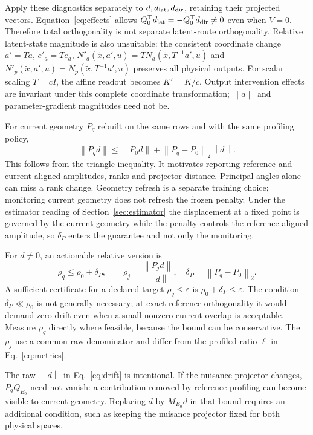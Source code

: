 \documentclass[11pt,a4paper]{article}
\newcommand{\norm}[1]{\left\lVert#1\right\rVert}
\theoremstyle{remark}
\begin{document}
Apply these diagnostics separately to $d,d_{\rm lat},d_{\rm dir}$, retaining their projected vectors. Equation~\eqref{eq:effects} allows $Q_0^\top d_{\rm lat}=-Q_0^\top d_{\rm dir}\ne0$ even when $V=0$. Therefore total orthogonality is not separate latent-route orthogonality. Relative latent-state magnitude is also unsuitable: the consistent coordinate change $a'=Ta$, $e'_a=Te_a$, $N'_a(\tilde x,a',u)=T N_a(\tilde x,T^{-1}a',u)$ and $N'_p(\tilde x,a',u)=N_p(\tilde x,T^{-1}a',u)$ preserves all physical outputs. For scalar scaling $T=cI$, the affine readout becomes $K'=K/c$. Output intervention effects are invariant under this complete coordinate transformation; $\norm a$ and parameter-gradient magnitudes need not be.

For current geometry $P_q$ rebuilt on the same rows and with the same profiling policy,
\begin{equation}\label{eq:drift}
 \norm{P_qd}\le\norm{P_0d}+\norm{P_q-P_0}_2\norm d.
\end{equation}
This follows from the triangle inequality. It motivates reporting reference and current aligned amplitudes, ranks and projector distance. Principal angles alone can miss a rank change. Geometry refresh is a separate training choice; monitoring current geometry does not refresh the frozen penalty. Under the estimator reading of Section~\ref{sec:estimator} the displacement at a fixed point is governed by the current geometry while the penalty controls the reference-aligned amplitude, so $\delta_P$ enters the guarantee and not only the monitoring.

For $d\ne0$, an actionable relative version is
\begin{equation}\label{eq:relative-drift}
 \rho_q\le\rho_0+\delta_P,\qquad
 \rho_j=\frac{\norm{P_jd}}{\norm d},\quad
 \delta_P=\norm{P_q-P_0}_2.
\end{equation}
A sufficient certificate for a declared target $\rho_q\le\varepsilon$ is $\rho_0+\delta_P\le\varepsilon$. The condition $\delta_P\ll\rho_0$ is not generally necessary; at exact reference orthogonality it would demand zero drift even when a small nonzero current overlap is acceptable. Measure $\rho_q$ directly where feasible, because the bound can be conservative. The $\rho_j$ use a common raw denominator and differ from the profiled ratio $\ell$ in Eq.~\eqref{eq:metrics}.

The raw $\norm d$ in Eq.~\eqref{eq:drift} is intentional. If the nuisance projector changes, $P_qQ_{E_0}$ need not vanish: a contribution removed by reference profiling can become visible to current geometry. Replacing $d$ by $M_{E_0}d$ in that bound requires an additional condition, such as keeping the nuisance projector fixed for both physical spaces.
\end{document}
